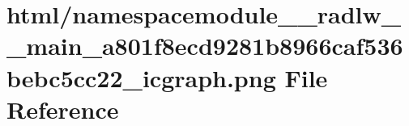 \hypertarget{namespacemodule____radlw____main__a801f8ecd9281b8966caf536bebc5cc22__icgraph_8png}{}\section{html/namespacemodule\+\_\+\+\_\+radlw\+\_\+\+\_\+main\+\_\+a801f8ecd9281b8966caf536bebc5cc22\+\_\+icgraph.png File Reference}
\label{namespacemodule____radlw____main__a801f8ecd9281b8966caf536bebc5cc22__icgraph_8png}
